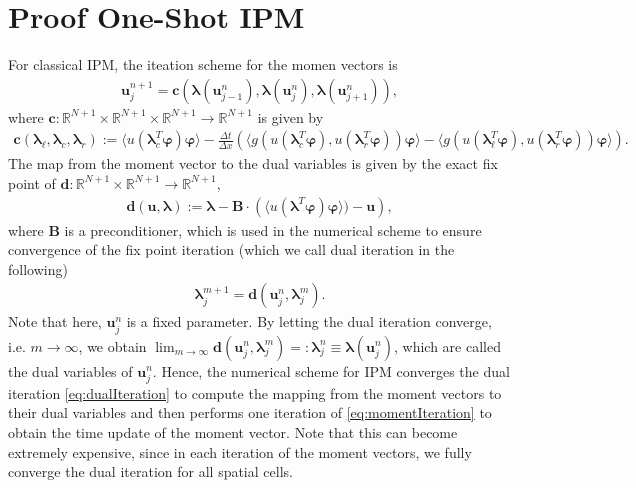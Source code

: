 \documentclass[10pt, a4paper, titlepage, bibliography=totocnumbered]{article}
\begin{document}
\section*{Proof One-Shot IPM}
For classical IPM, the iteation scheme for the momen vectors is
\begin{align}\label{eq:momentIteration}
\bm{u}_j^{n+1} = \bm{c}\left(\bm{\lambda}(\bm{u}_{j-1}^n),\bm{\lambda}(\bm{u}_{j}^n),\bm{\lambda}(\bm{u}_{j+1}^n)\right),
\end{align}
where $\bm{c}:\mathbb{R}^{N+1}\times\mathbb{R}^{N+1}\times\mathbb{R}^{N+1}\to\mathbb{R}^{N+1}$ is given by
\begin{align*}
\bm{c}\left(\bm{\lambda}_{\ell},\bm{\lambda}_c,\bm{\lambda}_r\right):= \langle u(\bm{\lambda}_c^T\bm{\varphi})\bm{\varphi}\rangle - \frac{\Delta t}{\Delta x}\left(\langle g(u(\bm{\lambda}_c^T\bm{\varphi}),u(\bm{\lambda}_r^T\bm{\varphi}))\bm{\varphi}\rangle-\langle g(u(\bm{\lambda}_{\ell}^T\bm{\varphi}),u(\bm{\lambda}_r^T\bm{\varphi}))\bm{\varphi}\rangle\right).
\end{align*}
The map from the moment vector to the dual variables is given by the exact fix point of $\bm{d}:\mathbb{R}^{N+1}\times\mathbb{R}^{N+1}\to\mathbb{R}^{N+1}$,
\begin{align*}
\bm{d}(\bm{u},\bm{\lambda}):= \bm{\lambda}-\bm{B}\cdot \left(\langle u(\bm{\lambda}^T\bm{\varphi})\bm{\varphi}\rangle)-\bm{u}\right),
\end{align*}
where $\bm{B}$ is a preconditioner, which is used in the numerical scheme to ensure convergence of the fix point iteration (which we call dual iteration in the following)
\begin{align}\label{eq:dualIteration}
\bm{\lambda}_j^{m+1} = \bm{d}(\bm{u}_j^{n},\bm{\lambda}_j^m).
\end{align}
Note that here, $\bm{u}_j^{n}$ is a fixed parameter. By letting the dual iteration converge, i.e. $m\rightarrow\infty$, we obtain $\lim_{m\rightarrow\infty}\bm{d}(\bm{u}_j^{n},\bm{\lambda}_j^m) =:\bm{\lambda}_j^{n} \equiv \bm\lambda(\bm{u}_j^{n})$, which are called the dual variables of $\bm{u}_j^{n}$. Hence, the numerical scheme for IPM converges the dual iteration \eqref{eq:dualIteration} to compute the mapping from the moment vectors to their dual variables and then performs one iteration of \eqref{eq:momentIteration} to obtain the time update of the moment vector. Note that this can become extremely expensive, since in each iteration of the moment vectors, we fully converge the dual iteration for all spatial cells.
\end{document}
